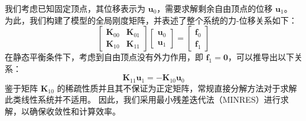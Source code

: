 我们考虑已知固定顶点，其位移表示为 $\bm{u}_0$，需要求解剩余自由顶点的位移 $\bm{u}_1$。
为此，我们构建了模型的全局刚度矩阵，并表述了整个系统的力-位移关系如下：
\begin{equation}
  \begin{bmatrix}
    \bm{K}_{00} & \bm{K}_{01} \\
    \bm{K}_{10} & \bm{K}_{11}
  \end{bmatrix}
  \begin{bmatrix}
    \bm{u}_0 \\
    \bm{u}_1
  \end{bmatrix}
  =
  \begin{bmatrix}
    \bm{f}_0 \\
    \bm{f}_1
  \end{bmatrix}
\end{equation}
在静态平衡条件下，考虑到自由顶点没有外力作用，即 $\bm{f}_1 = \bm{0}$，可以推导出以下关系：
\begin{equation} \label{eq:mtm-solve}
  \bm{K}_{11} \bm{u}_1 = - \bm{K}_{10} \bm{u}_0
\end{equation}
鉴于矩阵 $\bm{K}_{10}$ 的稀疏性质并且其不保证为正定矩阵，常规直接分解方法对于求解此类线性系统并不适用。
因此，我们采用最小残差迭代法（MINRES）进行求解，以确保收敛性和计算效率。
